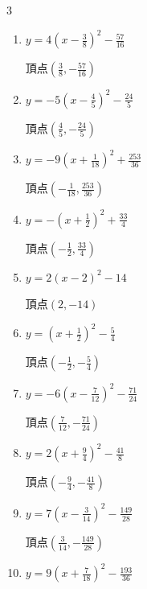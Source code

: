 \begin{multicols}{3}
\begin{enumerate}
        $\displaystyle 頂点\left( -\frac{1}{18} , \frac{143}{36} \right)$

  \item $\displaystyle y=4\left( x-\frac{3}{8}\right)^{2}-\frac{57}{16}$

        $\displaystyle 頂点\left( \frac{3}{8} , -\frac{57}{16} \right)$

\columnbreak %

  \item $\displaystyle y=-5\left( x-\frac{4}{5}\right)^{2}-\frac{24}{5}$

        $\displaystyle 頂点\left( \frac{4}{5} , -\frac{24}{5} \right)$

  \item $\displaystyle y=-9\left( x+\frac{1}{18}\right)^{2}+\frac{253}{36}$

        $\displaystyle 頂点\left( -\frac{1}{18} , \frac{253}{36} \right)$

  \item $\displaystyle y=-\left( x+\frac{1}{2}\right)^{2}+\frac{33}{4}$

        $\displaystyle 頂点\left( -\frac{1}{2} , \frac{33}{4} \right)$

  \item $\displaystyle y=2\left( x-2\right)^{2}-14$

        $\displaystyle 頂点\left( 2 , -14 \right)$

  \item $\displaystyle y=\left( x+\frac{1}{2}\right)^{2}-\frac{5}{4}$

        $\displaystyle 頂点\left( -\frac{1}{2} , -\frac{5}{4} \right)$

  \item $\displaystyle y=-6\left( x-\frac{7}{12}\right)^{2}-\frac{71}{24}$

        $\displaystyle 頂点\left( \frac{7}{12} , -\frac{71}{24} \right)$

  \item $\displaystyle y=2\left( x+\frac{9}{4}\right)^{2}-\frac{41}{8}$

        $\displaystyle 頂点\left( -\frac{9}{4} , -\frac{41}{8} \right)$

  \item $\displaystyle y=7\left( x-\frac{3}{14}\right)^{2}-\frac{149}{28}$

        $\displaystyle 頂点\left( \frac{3}{14} , -\frac{149}{28} \right)$

  \item $\displaystyle y=9\left( x+\frac{7}{18}\right)^{2}-\frac{193}{36}$


\end{enumerate}
\end{multicols}
